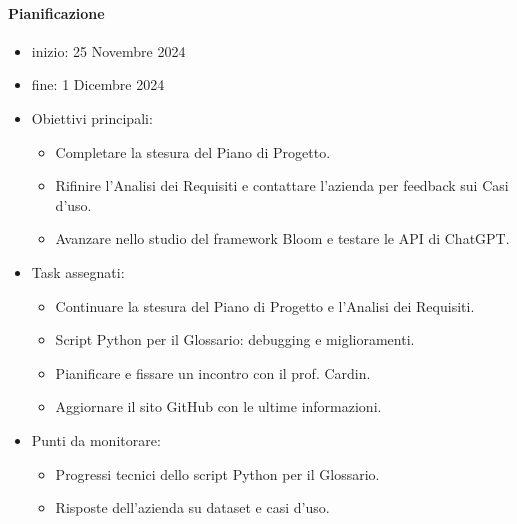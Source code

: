 \documentclass{article}
\begin{document}
                \paragraph{Pianificazione}
                \begin{itemize}
                    \item inizio: 25 Novembre 2024
                    \item fine: 1 Dicembre 2024
                \end{itemize}
                \begin{itemize}
                    \item Obiettivi principali:
                    \begin{itemize}
                        \item Completare la stesura del Piano di Progetto.
                        \item Rifinire l'Analisi dei Requisiti e contattare l'azienda per feedback sui Casi d'uso.
                        \item Avanzare nello studio del framework Bloom e testare le API di ChatGPT.
                        \end{itemize}
                    \item Task assegnati:
                    \begin{itemize}
                        \item Continuare la stesura del Piano di Progetto e l'Analisi dei Requisiti.
                        \item Script Python per il Glossario: debugging e miglioramenti.
                        \item Pianificare e fissare un incontro con il prof. Cardin.
                        \item Aggiornare il sito GitHub con le ultime informazioni.
                        \end{itemize}
                    \item Punti da monitorare:
                    \begin{itemize}
                        \item Progressi tecnici dello script Python per il Glossario.
                        \item Risposte dell'azienda su dataset e casi d'uso.
                        \end{itemize}
                \end{itemize}

\end{document}
